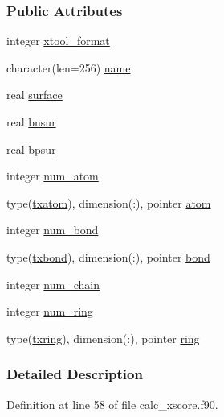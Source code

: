\subsubsection*{Public Attributes}
\begin{DoxyCompactItemize}
\item 
integer \hyperlink{structcalc__xscore_1_1txprotein_ae01af91683491be6a3ffbe960d4d2231}{xtool\-\_\-format}
\item 
character(len=256) \hyperlink{structcalc__xscore_1_1txprotein_afa0acd5392140675b62b46c98a514ec8}{name}
\item 
real \hyperlink{structcalc__xscore_1_1txprotein_a8b01b3647674beb531f864574b92561e}{surface}
\item 
real \hyperlink{structcalc__xscore_1_1txprotein_ad65f9841c16ab580f2e865f54263137f}{bnsur}
\item 
real \hyperlink{structcalc__xscore_1_1txprotein_a4c235b4396ab53ee1f0748503cea6952}{bpsur}
\item 
integer \hyperlink{structcalc__xscore_1_1txprotein_a00a02265abe7cf1b18ac87c41d051357}{num\-\_\-atom}
\item 
type(\hyperlink{structcalc__xscore_1_1txatom}{txatom}), dimension(\-:), pointer \hyperlink{structcalc__xscore_1_1txprotein_a2a6da467746d70566519b497e0c7576f}{atom}
\item 
integer \hyperlink{structcalc__xscore_1_1txprotein_adb84ec9cabf75b3e18bd223c04928114}{num\-\_\-bond}
\item 
type(\hyperlink{structcalc__xscore_1_1txbond}{txbond}), dimension(\-:), pointer \hyperlink{structcalc__xscore_1_1txprotein_a03749ea875270563dda039b0170603fd}{bond}
\item 
integer \hyperlink{structcalc__xscore_1_1txprotein_a283f41d0171a26a830af0be1e30784c8}{num\-\_\-chain}
\item 
integer \hyperlink{structcalc__xscore_1_1txprotein_a7417ab64ee2e434d3abff8a11fe345c1}{num\-\_\-ring}
\item 
type(\hyperlink{structcalc__xscore_1_1txring}{txring}), dimension(\-:), pointer \hyperlink{structcalc__xscore_1_1txprotein_a0a5f21d3b183496adecb2ac25d0b151b}{ring}
\end{DoxyCompactItemize}


\subsubsection{Detailed Description}


Definition at line 58 of file calc\-\_\-xscore.\-f90.



